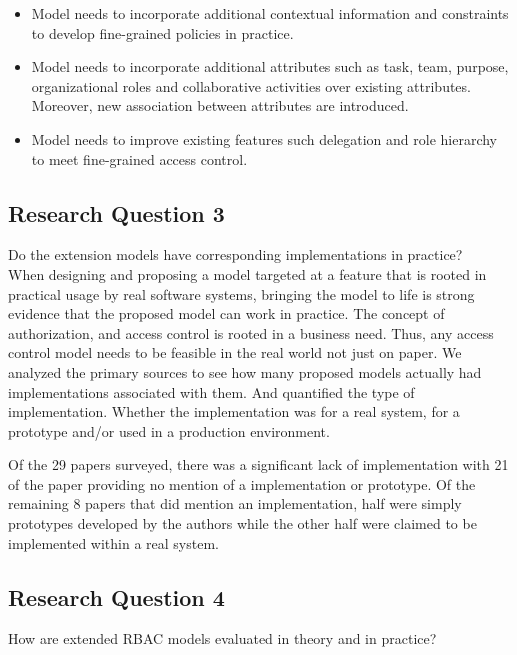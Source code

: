 \begin{itemize}
	\item Model needs to incorporate additional contextual information and constraints to develop fine-grained policies in practice.
	\item Model needs to incorporate additional attributes such as
	task, team, purpose, organizational roles and collaborative activities over existing attributes. Moreover, new association between attributes
	are introduced. 
		\item Model needs to improve existing features such delegation and role hierarchy to meet fine-grained access control. 
\end{itemize}



\subsection{Research Question 3}

Do the extension models have corresponding implementations in practice? \\

When designing and proposing a model targeted at a feature that is rooted in practical
usage by real software systems, bringing the model to life is strong evidence that the
proposed model can work in practice.  The concept of authorization, and access control
is rooted in a business need.  Thus, any access control model needs to be feasible
in the real world not just on paper.  We analyzed the primary sources to see how many
proposed models actually had implementations associated with them.  And quantified the
type of implementation.  Whether the implementation was for a real system, for a prototype
and/or used in a production environment.

Of the 29 papers surveyed, there was a significant lack of implementation with 21 of the paper providing no
mention of a implementation or prototype.  Of the remaining 8 papers that did mention an implementation, half 
were simply prototypes developed by the authors while the other half were claimed to be implemented within a real
system.

\subsection{Research Question 4}

How are extended RBAC models evaluated in theory and in practice? \\

